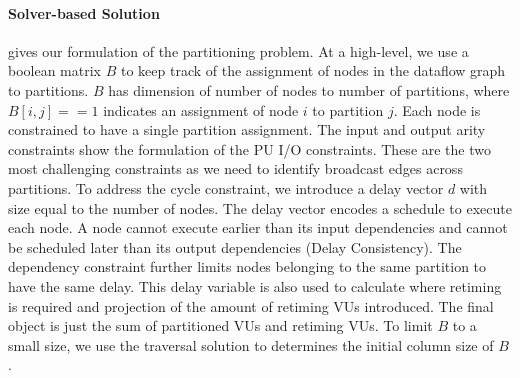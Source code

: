 
\paragraph{Solver-based Solution}
 gives our formulation of the partitioning problem.
At a high-level, we use a boolean matrix $B$ to keep track of the assignment of nodes in the dataflow graph to partitions. 
$B$ has dimension of number of nodes to number of partitions, where$B[i,j]==1$ indicates an assignment of node $i$ to partition $j$. 
Each node is constrained to have a single partition assignment.
The input and output arity constraints show the formulation of the PU I/O constraints.
These are the two most challenging constraints as we need to identify broadcast edges across partitions.
To address the cycle constraint, we introduce a delay vector $d$ with size equal to the number of nodes. 
The delay vector encodes a schedule to execute each node. 
A node cannot execute earlier than its input dependencies and cannot be scheduled later than its output dependencies (Delay Consistency).
The dependency constraint further limits nodes belonging to the same partition to have the same delay.
This delay variable is also used to calculate where retiming is required and projection of the amount of retiming VUs introduced. 
The final object is just the sum of partitioned VUs and retiming VUs.
To limit $B$ to a small size, we use the traversal solution to determines the initial column size of $B$.



